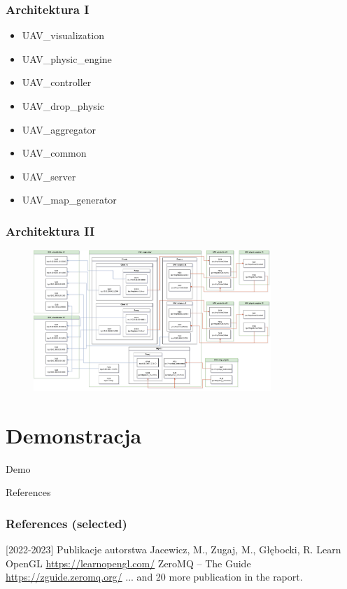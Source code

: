 \documentclass[aspectratio=169]{beamer}
\begin{document}
\begin{frame} %
	\frametitle{Architektura I}
	\begin{itemize}
		\item<2-> UAV\_visualization
		\item<3-> UAV\_physic\_engine
		\item<4-> UAV\_controller
		\item<5-> UAV\_drop\_physic
		\item<6-> UAV\_aggregator
		\item<7-> UAV\_common
		\item<8-> UAV\_server
		\item<9-> UAV\_map\_generator
	\end{itemize}
\end{frame}

\begin{frame}
	\frametitle{Architektura II}
	\begin{figure}
		\centering
		\includegraphics[width=0.8\textwidth]{ZMQinMINIUAV.drawio.png}
	\end{figure}
\end{frame}

\section{Demonstracja}

\begin{frame}
	  \begin{center}
	\Huge Demo
	\end{center}
\end{frame}

\begin{frame}{References}
	\frametitle{References (selected)}
	\begin{thebibliography}{10}
		\beamertemplatebookbibitems
		[2022-2023] Publikacje autorstwa
		\newblock Jacewicz, M., Zugaj, M., Głębocki, R.
		 Learn OpenGL
		\newblock \url{https://learnopengl.com/}
		 ZeroMQ -- The Guide
		\newblock \url{https://zguide.zeromq.org/}
		 ... and 20 more publication in the raport.
	\end{thebibliography}
\end{frame}
\end{document}
